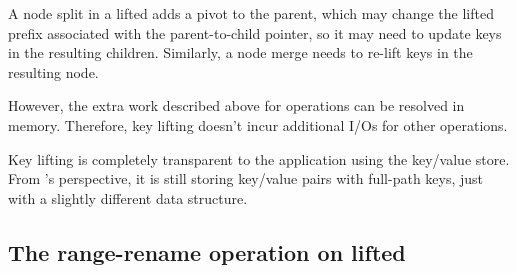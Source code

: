 A node split in a lifted \bet adds a pivot to the parent, which may change
the lifted prefix associated with the parent-to-child pointer, so it may need to
update keys in the resulting children.
Similarly, a node merge needs to re-lift keys in the resulting node.

However, the extra work described above for \bet operations can be resolved in
memory.
Therefore, key lifting doesn't incur additional I/Os for other \bet operations.

Key lifting is completely transparent to the application using the key/value
store.
From \betrfs's perspective, it is still storing key/value pairs with
full-path keys, just with a slightly different data structure.

\subsection{The range-rename operation on lifted \bets}
\label{sec:rr:rr}

